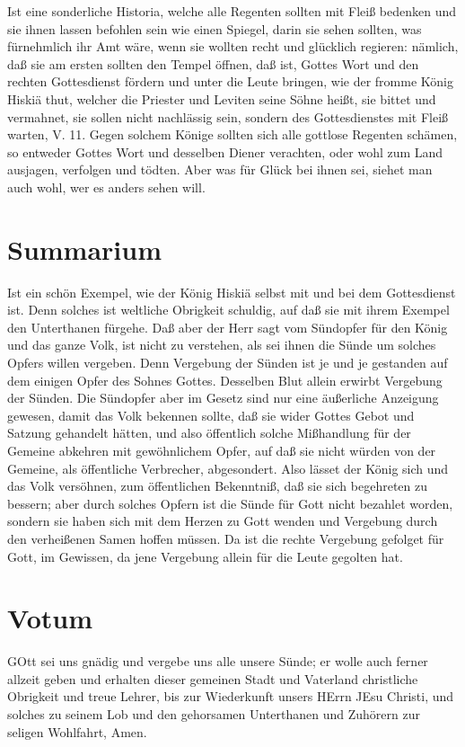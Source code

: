Ist eine sonderliche Historia, welche alle Regenten sollten mit Fleiß bedenken und sie ihnen lassen befohlen sein wie einen Spiegel, darin sie sehen sollten, was fürnehmlich ihr Amt wäre, wenn sie wollten recht und glücklich regieren: nämlich, daß sie am ersten sollten den Tempel öffnen, daß ist, Gottes Wort und den rechten Gottesdienst fördern und unter die Leute bringen, wie der fromme König Hiskiä thut, welcher die Priester und Leviten seine Söhne heißt, sie bittet und vermahnet, sie sollen nicht nachlässig sein, sondern des Gottesdienstes mit Fleiß warten, V. 11. Gegen solchem Könige sollten sich alle gottlose Regenten schämen, so entweder Gottes Wort und desselben Diener verachten, oder wohl zum Land ausjagen, verfolgen und tödten. Aber was für Glück bei ihnen sei, siehet man auch wohl, wer es anders sehen will.

\section{Summarium}

Ist ein schön Exempel, wie der König Hiskiä selbst mit und bei dem Gottesdienst ist. Denn solches ist weltliche Obrigkeit schuldig, auf daß sie mit ihrem Exempel den Unterthanen fürgehe. Daß aber der Herr sagt vom Sündopfer für den König und das ganze Volk, ist nicht zu verstehen, als sei ihnen die Sünde um solches Opfers willen vergeben. Denn Vergebung der Sünden ist je und je gestanden auf dem einigen Opfer des Sohnes Gottes. Desselben Blut allein erwirbt Vergebung der Sünden. Die Sündopfer aber im Gesetz sind nur eine äußerliche Anzeigung gewesen, damit das Volk bekennen sollte, daß sie wider Gottes Gebot und Satzung gehandelt hätten, und also öffentlich solche Mißhandlung für der Gemeine abkehren mit gewöhnlichem Opfer, auf daß sie nicht würden von der Gemeine, als öffentliche Verbrecher, abgesondert. Also lässet der König sich und das Volk versöhnen, zum öffentlichen Bekenntniß, daß sie sich begehreten zu bessern; aber durch solches Opfern ist die Sünde für Gott nicht bezahlet worden, sondern sie haben sich mit dem Herzen zu Gott wenden und Vergebung durch den verheißenen Samen hoffen müssen. Da ist die rechte Vergebung gefolget für Gott, im Gewissen, da jene Vergebung allein für die Leute gegolten hat.

\section{Votum}

GOtt sei uns gnädig und vergebe uns alle unsere Sünde; er wolle auch ferner allzeit geben und erhalten dieser gemeinen Stadt und Vaterland christliche Obrigkeit und treue Lehrer, bis zur Wiederkunft unsers HErrn JEsu Christi, und solches zu seinem Lob und den gehorsamen Unterthanen und Zuhörern zur seligen Wohlfahrt, Amen.

